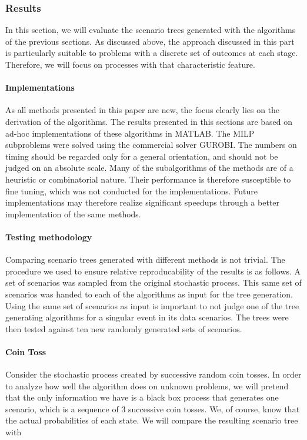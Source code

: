 \subsubsection{Results}
In this section, we will evaluate the scenario trees generated with the algorithms of the previous sections.
As discussed above, the approach discussed in this part is particularly suitable to problems with a discrete set of outcomes at each stage.
Therefore, we will focus on processes with that characteristic feature.
%
\paragraph{Implementations}
As all methods presented in this paper are new, the focus clearly lies on the derivation of the algorithms.
The results presented in this sections are based on ad-hoc implementations of these algorithms in MATLAB.
The MILP subproblems were solved using the commercial solver GUROBI.
The numbers on timing should be regarded only for a general orientation, and should not be judged on an absolute scale.
Many of the subalgorithms of the methods are of a heuristic or combinatorial nature.
Their performance is therefore susceptible to fine tuning, which was not conducted for the implementations.
Future implementations may therefore realize significant speedups through a better implementation of the same methods.
%
\paragraph{Testing methodology} 
Comparing scenario trees generated with different methods is not trivial.
The procedure we used to ensure relative reproducability of the results is as follows.
A set of scenarios was sampled from the original stochastic process.
This same set of scenarios was handed to each of the algorithms as input for the tree generation.
Using the same set of scenarios as input is important to not judge one of the tree generating algorithms for a singular event in its data scenarios.
The trees were then tested against ten new randomly generated sets of scenarios.
\paragraph{Coin Toss} Consider the stochastic process created by successive random coin tosses.
In order to analyze how well the algorithm does on unknown problems, we will pretend that the only information we have is a black box process that generates one scenario, which is a sequence of 3 successive coin tosses.
We, of course, know that the actual probabilities of each state.
We will compare the resulting scenario tree with
